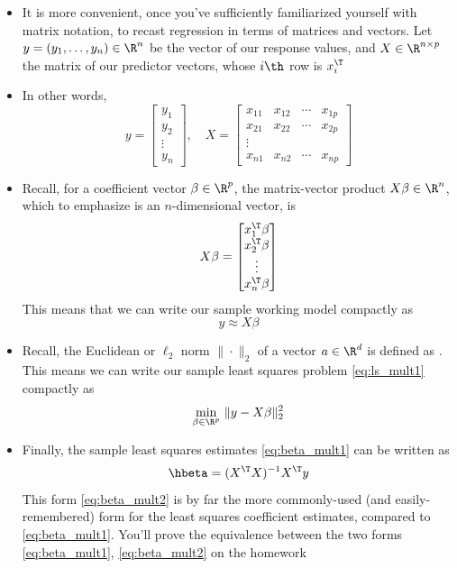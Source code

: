 \documentclass{article}
\begin{document}
\begin{itemize}
\item It is more convenient, once you've sufficiently familiarized yourself with
  matrix notation, to recast regression in terms of matrices and vectors. Let $y 
  = (y_1, \dots, y_n) \in \R^n$ be the vector of our response values, and $X \in
  \R^{n \times p}$ the matrix of our predictor vectors, whose $i\th$ row is
  $x_i^\T$    

\item In other words,
  \[
  y = \begin{bmatrix} 
    y_1 \\ y_2 \\ \vdots \\ y_n 
  \end{bmatrix}, \quad 
  X = \begin{bmatrix} 
    x_{11} & x_{12} & \cdots & x_{1p} \\
    x_{21} & x_{22} & \cdots & x_{2p} \\
    \vdots & & & \\
    x_{n1} & x_{n2} & \cdots & x_{np} 
    \end{bmatrix}
  \]

\item Recall, for a coefficient vector $\beta \in \R^p$, the matrix-vector
  product $X \beta \in \R^n$, which to emphasize is an $n$-dimensional vector,
  is    
  \[
  X \beta = 
  \begin{bmatrix} 
    x_1^\T \beta \\ x_2^\T \beta \\ \vdots \\ x_n^\T \beta 
  \end{bmatrix}
  \]
  This means that we can write our sample working model compactly as
  \[
  y \approx X \beta
  \]

\item Recall, the Euclidean or $\ell_2$ norm $\|\cdot\|_2$ of a vector $a \in
  \R^d$ is defined as . This means we
  can write our sample least squares problem \eqref{eq:ls_mult1} compactly as  
  \begin{equation}
  \label{eq:ls_mult2}
  \min_{\beta \in \R^p} \, \|y - X \beta\|_2^2
  \end{equation}

\item Finally, the sample least squares estimates \eqref{eq:beta_mult1} can 
  be written as 
  \begin{equation}
  \label{eq:beta_mult2}
  \hbeta = (X^\T X)^{-1} X^\T y  
  \end{equation}
  This form \eqref{eq:beta_mult2} is by far the more commonly-used (and
  easily-remembered) form for the least squares coefficient estimates, compared
  to \eqref{eq:beta_mult1}. You'll prove the equivalence between the two
  forms \eqref{eq:beta_mult1}, \eqref{eq:beta_mult2} on the homework 


\end{itemize}
\end{document}
